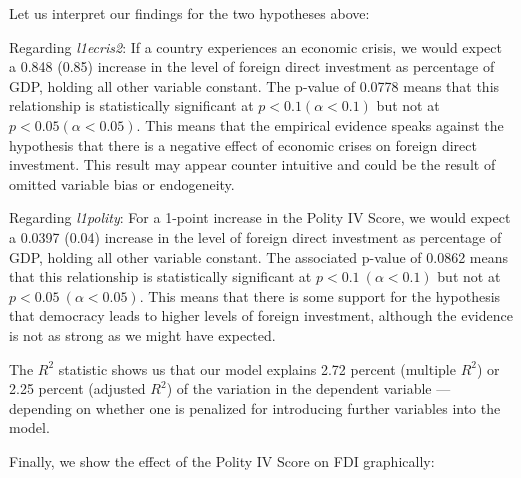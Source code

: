 \documentclass[12pt]{article}\usepackage[]{graphicx}\usepackage[]{color}
\begin{document}
Let us interpret our findings for the two hypotheses above:

Regarding \textit{l1ecris2}: If a country experiences an economic crisis, we would expect a 0.848 (0.85) increase in the level of foreign direct investment as percentage of GDP, holding all other variable constant. The p-value of 0.0778 means that this relationship is statistically significant at $p < 0.1 (\alpha < 0.1)$ but not at $p < 0.05 (\alpha < 0.05)$. This means that the empirical evidence speaks against the hypothesis that there is a negative effect of economic crises on foreign direct investment. This result may appear counter intuitive and could be the result of omitted variable bias or endogeneity.

Regarding \textit{l1polity}: For a 1-point increase in the Polity IV Score, we would expect a 0.0397 (0.04) increase in the level of foreign direct investment as percentage of GDP, holding all other variable constant. The associated p-value of 0.0862 means that this relationship is statistically significant at $p < 0.1 \ (\alpha < 0.1)$ but not at $p < 0.05 \ (\alpha < 0.05)$. This means that there is some support for the hypothesis that democracy leads to higher levels of foreign investment, although the evidence is not as strong as we might have expected.

The $R^2$ statistic shows us that our model explains 2.72 percent (multiple $R^2$) or 2.25 percent (adjusted $R^2$) of the variation in the dependent variable --- depending on whether one is penalized for introducing further variables into the model.

Finally, we show the effect of the Polity IV Score on FDI graphically:
\end{document}

